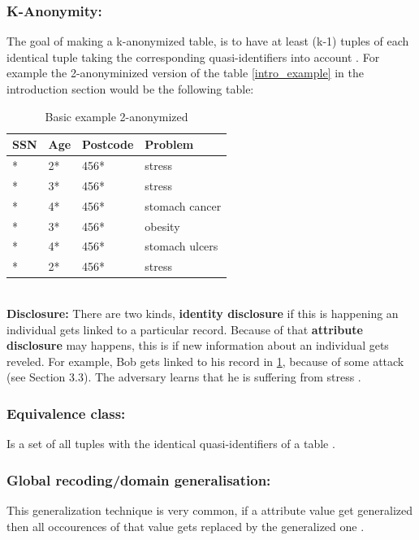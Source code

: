 \documentclass{llncs}
\begin{document}
\subsubsection{K-Anonymity:}
The goal of making a k-anonymized table, is to have at least (k-1) tuples of each identical tuple taking the corresponding quasi-identifiers into account \cite{sweeney2002k,li2006achieving}. For example the 2-anonyminized version of the table \ref{intro_example} in the introduction section would be the following table:
\begin{table}[]
	\centering
	\caption{Basic example 2-anonymized}
	\label{intro_example_sol}
	\begin{tabular}{@{}llll@{}}
		\toprule
		SSN         & Age & Postcode & Problem         \\ \midrule
		* & 2*  & 456*     & stress \\
		* & 3*  & 456*     & stress          \\
		* & 4*  & 456*     & stomach cancer  \\
		* & 3*  & 456*     & obesity         \\
		* & 4*  & 456*     & stomach ulcers  \\
		* & 2*  & 456*     & stress          \\ \bottomrule
	\end{tabular}
\end{table}\\
\textbf{Disclosure:} There are two kinds, \textbf{identity disclosure} if this is happening an individual gets linked to a particular record. Because of that \textbf{attribute disclosure} may happens, this is if new information about an individual gets reveled. For example, Bob gets linked to his record in \ref{intro_example_sol}, because of some attack (see Section 3.3). The adversary learns that he is suffering from stress \cite{sweeney2002k}.  
\subsubsection{Equivalence class:}
Is a set of all tuples with the identical quasi-identifiers of a table \cite{li2006achieving}.
\subsubsection{Global recoding/domain generalisation:}
This generalization technique is very common, if a attribute value get generalized then all occourences of that value gets replaced by the generalized one \cite{sweeney2002k,sweeney2002achieving,li2006achieving,incognito}. 
\end{document}

